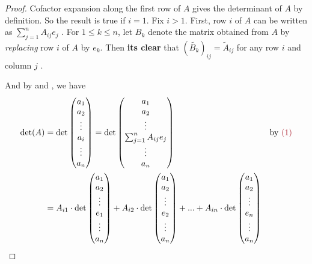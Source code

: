 \begin{proof}
Cofactor expansion along the first row of \(A\) gives the determinant of \(A\) by definition.
So the result is true if \(i = 1\).
Fix \(i > 1\).
First, row \(i\) of \(A\) can be written as \(\sum_{j = 1}^n A_{ij} e_j\) .
For \(1 \le k \le n\), let \(B_k\) denote the matrix obtained
from \(A\) by \emph{replacing} row \(i\) of \(A\) by \(e_k\).
Then \textbf{its clear} that \((\widetilde{B_k})_{ij} = \tilde{A}_{ij}\) for any row \(i\) and column \(j\) .

And by  and , we have
\begin{align*}
    \det(A) & = \det \begin{pmatrix}
                    a_1 \\ a_2 \\ \vdots \\ a_i \\ \vdots \\ a_n
                \end{pmatrix} 
              = \det \begin{pmatrix}
                    a_1 \\ a_2 \\ \vdots \\ \sum_{j = 1}^n A_{ij} e_j \\ \vdots \\ a_n
                \end{pmatrix} & \text{by \MAROON{(1)}} \\
            & = A_{i1} \cdot \det \begin{pmatrix}
                    a_1 \\ a_2 \\ \vdots \\ e_1 \\ \vdots \\ a_n
                \end{pmatrix}
              + A_{i2} \cdot \det \begin{pmatrix}
                    a_1 \\ a_2 \\ \vdots \\ e_2 \\ \vdots \\ a_n
                \end{pmatrix}
              + ...
              + A_{in} \cdot \det \begin{pmatrix}
                    a_1 \\ a_2 \\ \vdots \\ e_n \\ \vdots \\ a_n

\end{pmatrix}
\end{align*}
\end{proof}
